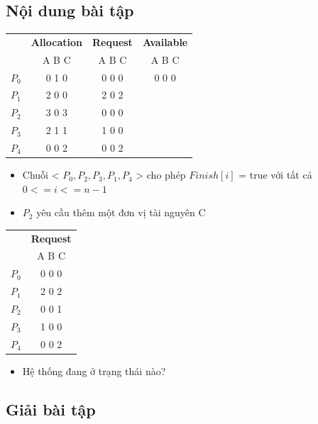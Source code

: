 \documentclass[12pt, letterpaper]{article}
\begin{document}
\subsection{Nội dung bài tập}
\begin{table}[H]
    \centering
    \begin{tabular}{|c|c|c|c|}
        \toprule
        & \textbf{Allocation} & \textbf{Request} & \textbf{Available} \\
        & A B C & A B C & A B C \\
        \midrule
        $P_0$ & 0 1 0 & 0 0 0 & 0 0 0 \\
        $P_1$ & 2 0 0 & 2 0 2 &\\
        $P_2$ & 3 0 3 & 0 0 0 &\\
        $P_3$ & 2 1 1 & 1 0 0 &\\
        $P_4$ & 0 0 2 & 0 0 2 &\\
        \bottomrule
    \end{tabular}
\end{table}

\begin{itemize}
    \item Chuỗi < $P_0, P_2, P_3, P_1, P_4$ > cho phép $Finish[i]$ = true với tất cả $0 <= i <= n - 1$ 
    \item $P_2$ yêu cầu thêm một đơn vị tài nguyên C
\end{itemize}

\begin{table}[H]
    \centering
    \begin{tabular}{|c|c|}
        \toprule
        & \textbf{Request}\\
        & A B C\\
        \midrule
        $P_0$ & 0 0 0 \\
        $P_1$ & 2 0 2 \\
        $P_2$ & 0 0 1 \\
        $P_3$ & 1 0 0 \\
        $P_4$ & 0 0 2 \\
        \bottomrule
    \end{tabular}
\end{table}
\begin{itemize}
    \item Hệ thống đang ở trạng thái nào?
\end{itemize}

\subsection{Giải bài tập}
\end{document}
